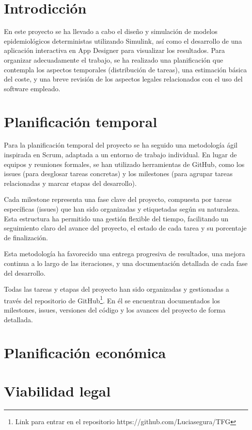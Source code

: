 
\section{Introdicción}
En este proyecto se ha llevado a cabo el diseño y simulación de modelos epidemiológicos deterministas utilizando Simulink, así como el desarrollo de una aplicación interactiva en App Designer para visualizar los resultados. Para organizar adecuadamente el trabajo, se ha realizado una planificación que contempla los aspectos temporales (distribución de tareas), una estimación básica del coste, y una breve revisión de los aspectos legales relacionados con el uso del software empleado.


\section{Planificación temporal}
Para la planificación temporal del proyecto se ha seguido una metodología ágil inspirada en Scrum, adaptada a un entorno de trabajo individual. En lugar de equipos y reuniones formales, se han utilizado herramientas de GitHub, como los issues (para desglosar tareas concretas) y los milestones (para agrupar tareas relacionadas y marcar etapas del desarrollo).

Cada milestone representa una fase clave del proyecto, compuesta por tareas específicas (issues) que han sido organizadas y etiquetadas según su naturaleza. Esta estructura ha permitido una gestión flexible del tiempo, facilitando un seguimiento claro del avance del proyecto, el estado de cada tarea y su porcentaje de finalización.

Esta metodología ha favorecido una entrega progresiva de resultados, una mejora continua a lo largo de las iteraciones, y una documentación detallada de cada fase del desarrollo.

Todas las tareas y etapas del proyecto han sido organizadas y gestionadas a través del repositorio de GitHub\footnote{Link para entrar en el repositorio https://github.com/Luciasegura/TFG}. En él se encuentran documentados los milestones, issues, versiones del código y los avances del proyecto de forma detallada.





\section{Planificación económica}

\section{Viabilidad legal}

